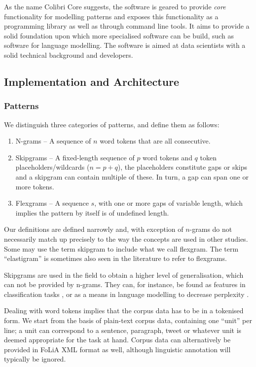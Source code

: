\documentclass[a4paper,12pt]{article}
\begin{document}
As the name Colibri Core suggests, the software is geared to provide
\emph{core} functionality for modelling patterns and exposes this functionality
as a programming library as well as through command line tools. It aims to
provide a solid foundation upon which more specialised software can be build,
such as software for language modelling. The software is aimed at
data scientists with a solid technical background and developers. 


\subsection{Implementation and Architecture}

\subsubsection{Patterns}

We distinguish three categories of patterns, and define them as follows:

\begin{enumerate}
    \item N-grams -- A sequence of $n$ word tokens that are all consecutive.
    \item Skipgrams -- A fixed-length sequence of $p$ word tokens and $q$ token placeholders/wildcards ($n=p+q$), the placeholders constitute gaps or skips and a skipgram can contain multiple of these. In turn, a gap can span one or more tokens. 
    \item Flexgrams -- A sequence $s$, with one or more gaps of variable length, which implies the pattern by itself is of undefined length.
\end{enumerate}

Our definitions are defined narrowly and, with exception of $n$-grams do not
necessarily match up precisely to the way the concepts are used in other studies. Some
may use the term skipgram to include what we call flexgram.  The term
``elastigram'' is sometimes also seen in the literature to refer to flexgrams. 

Skipgrams are used in the field to obtain a higher level of generalisation, which
can not be provided by n-grams. They can, for instance, be found as features in
classification tasks \cite{DHONDT}, or as a means in language modelling to
decrease perplexity \cite{Guthrie06}.

Dealing with word tokens implies that the corpus data has to be in a
tokenised form. We start from the basis of plain-text corpus data, containing one
``unit'' per line; a unit can correspond to a sentence, paragraph, tweet
or whatever unit is deemed appropriate for the task at hand. Corpus data can
alternatively be provided in FoLiA XML format \cite{FOLIAPAPER} as well, although linguistic
annotation will typically be ignored.
\end{document}
